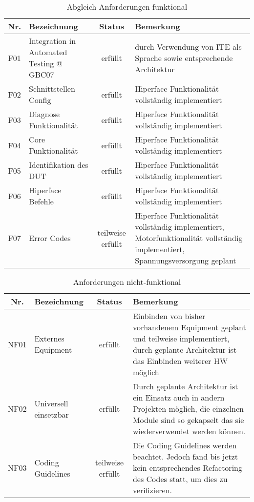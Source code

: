 \begin{table}[h]
\begin{center}
\begin{tabularx}{\textwidth}{|c|X|c|X|}
\hline
Nr. & Bezeichnung & Status & Bemerkung \\
\hline
F01 &Integration in Automated Testing @ GBC07 & erfüllt &  durch Verwendung von ITE als Sprache sowie entsprechende Architektur \\
\hline
F02 & Schnittstellen Config & erfüllt & Hiperface Funktionalität vollständig implementiert \\
\hline
F03 & Diagnose Funktionalität & erfüllt & Hiperface Funktionalität vollständig implementiert \\
\hline
F04 & Core Funktionalität & erfüllt & Hiperface Funktionalität vollständig implementiert \\
\hline
F05 & Identifikation des DUT & erfüllt & Hiperface Funktionalität vollständig implementiert  \\
\hline
F06 & Hiperface Befehle & erfüllt & Hiperface Funktionalität vollständig implementiert \\
\hline
F07 & Error Codes & teilweise erfüllt & Hiperface Funktionalität vollständig implementiert, Motorfunktionalität vollständig implementiert, Spannungsversorgung geplant \\
\hline


\end{tabularx}
\end{center}
\caption{Abgleich Anforderungen funktional \label{tab:AbgleichF}}
\end{table}



\begin{table}[h]

\begin{center}

\begin{tabularx}{\textwidth}{|c|X|c|X|}

\hline
Nr. & Bezeichnung & Status & Bemerkung \\
\hline
NF01 & Externes Equipment & erfüllt & Einbinden von bisher vorhandenem Equipment geplant und teilweise implementiert, durch geplante Architektur ist das Einbinden weiterer HW möglich \\
\hline
NF02 & Universell einsetzbar & erfüllt & Durch geplante Architektur ist ein Einsatz auch in andern Projekten möglich, die einzelnen Module sind so gekapselt das sie wiederverwendet werden können. \\
\hline
NF03 & Coding Guidelines & teilweise erfüllt & Die Coding Guidelines werden beachtet. Jedoch fand bis jetzt kein entsprechendes Refactoring des Codes statt, um dies zu verifizieren. \\
\hline


\end{tabularx}
\caption{Anforderungen nicht-funktional \label{tab:AbgleichNF}}
\end{center}
\end{table}

	
